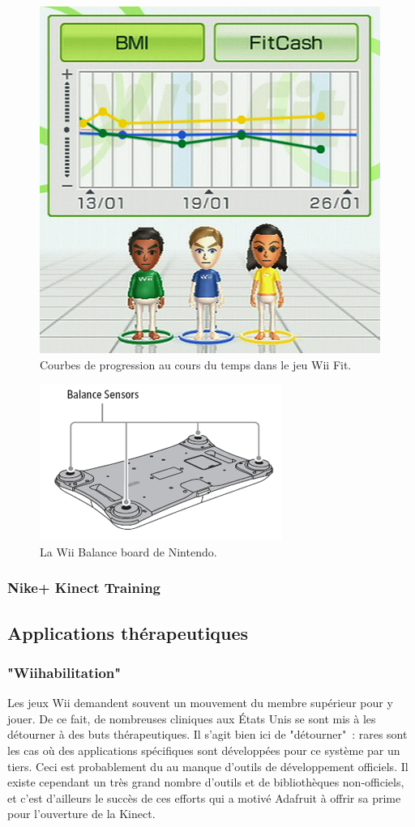 \begin{figure}[h!]
\centering
\includegraphics[width=0.5\linewidth]{images/wii_fit}
\caption{Courbes de progression au cours du temps dans le jeu Wii Fit.}
\label{fig:wii_fit}
\end{figure}

\begin{figure}[h!]
\centering
\includegraphics[width=0.5\linewidth]{images/balance_board}
\caption{La Wii Balance board de Nintendo.}
\label{fig:balance_board}
\end{figure}


\subsubsection{Nike+ Kinect Training}



\subsection{Applications thérapeutiques}

\subsubsection{"Wiihabilitation"}

Les jeux Wii demandent souvent un mouvement du membre supérieur pour y 
jouer. De ce fait, de nombreuses 
cliniques aux États Unis se sont mis à les détourner à des buts 
thérapeutiques. Il s'agit bien ici de "détourner"~: rares sont les cas où des
applications spécifiques sont développées pour ce système par un tiers. Ceci
est probablement du au manque d'outils de développement officiels. Il existe
cependant un très grand nombre d'outils et de bibliothèques non-officiels, et
c'est d'ailleurs le succès de ces efforts qui a motivé Adafruit à offrir sa prime
pour l'ouverture de la Kinect.



